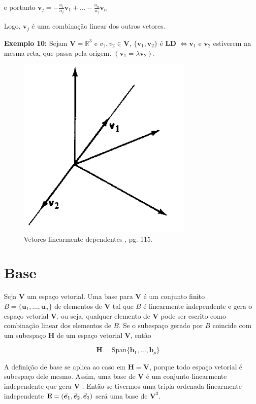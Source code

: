 \noindent e portanto $\mathbf{v}_j = -\frac{a_1}{a_j}\mathbf{v}_1 + \ldots -\frac{a_n}{a_j}\mathbf{v}_n$

\noindent Logo, $\mathbf{v}_j$ é uma combinação linear dos outros vetores.

\noindent\textbf{Exemplo 10:} Sejam $\mathbf{V} = \mathbb{R}^3$ e $v_1, v_2 \in \mathbf{V}$, $\{\mathbf{v}_1, \mathbf{v}_2\}$ é \textbf{LD} $\iff \mathbf{v}_1$ e $\mathbf{v}_2$ estiverem na mesma reta, que passa pela origem. $(\mathbf{v}_1 = \lambda\mathbf{v}_2)$.

\begin{figure}[H]
	\centering
	\includegraphics[scale=0.90]{cb_exemplo10.png}
	\caption{Vetores linearmente dependentes \cite{boldrini1980}, pg. 115.}
\end{figure}

\section{Base}
Seja $\mathbf{V}$ um espaço vetorial. Uma base para $\mathbf{V}$ é um conjunto finito $B = \{\mathbf{u}_1, \ldots, \mathbf{u}_n\}$ de elementos de $\mathbf{V}$ tal que $B$ é linearmente independente e gera o espaço vetorial $\mathbf{V}$, ou seja, qualquer elemento de $\mathbf{V}$ pode ser escrito como combinação linear dos elementos de $B$. Se o subespaço gerado por $B$ coincide com um subespaço $\mathbf{H}$ de um espaço vetorial $\mathbf{V}$, então

\begin{equation}
\mathbf{H} = \text{Span}\{\mathbf{b}_1, \ldots, \mathbf{b}_p\}
\end{equation}

A definição de base se aplica ao caso em $\mathbf{H} = \mathbf{V}$, porque todo espaço vetorial é subespaço dele mesmo. Assim, uma base de $\mathbf{V}$ é um conjunto linearmente independente que gera $\mathbf{V}$ \cite{lay1999}. Então se tivermos uma tripla ordenada linearmente independente $\mathbf{E} = (\va*{e}_1, \va*{e}_2, \va*{e}_3)$ será uma base de $\mathbf{V}^3$.

